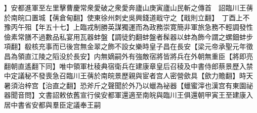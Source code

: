 】安都進軍至左里擊曹慶常衆愛破之衆愛奔廬山庚寅廬山民斬之傳首　詔臨川王蒨於南皖口置城【蒨倉甸翻】使東徐州刺史吳興錢道戢守之【戢則立翻】　丁酉上不豫丙午殂【年五十七】上臨戎制勝英謀獨運而為政務崇寛簡非軍旅急務不輕調發性儉素常膳不過數品私宴用瓦器蚌盤【調徒釣翻蚌盤者髹器以蚌為飾今謂之螺鈿蚌步項翻】殽核充事而已後宫無金翠之飾不設女樂時皇子昌在長安【梁元帝承聖元年徵昌為領直江陵之䧟没於長安】内無嫡嗣外有強敵宿將皆將兵在外朝無重臣【將即亮翻朝直遙翻下同】唯中領軍杜稜典宿衛兵在建康章皇后召稜及中書侍郎蔡景歷入禁中定議秘不發喪急召臨川王蒨於南皖景歷親與宦者宫人密營歛具【歛力贍翻】時天暑須治梓宫【治直之翻】恐斧斤之聲聞於外乃以蠟為袐器【蠟蜜滓也漢宫有東園祕器聞音問】文書詔敕依舊宣行侯安都軍還適至南皖與臨川王俱還朝甲寅王至建康入居中書省安都與羣臣定議奉王嗣